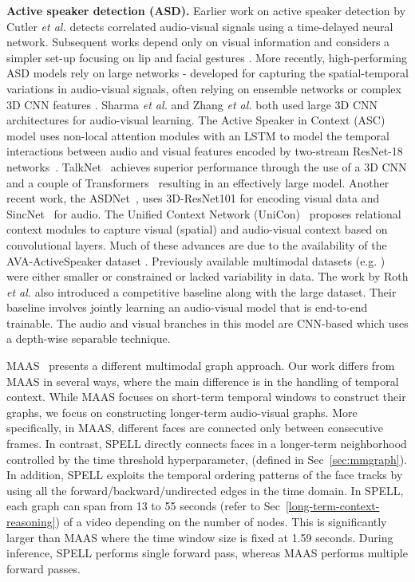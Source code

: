\documentclass[runningheads]{llncs}
\begin{document}
\textbf{Active speaker detection (ASD). } Earlier work on active speaker detection by Cutler \textit{et al.} \cite{cutler2000look} detects correlated audio-visual signals using a time-delayed neural network. Subsequent works depend only on visual information and considers a simpler set-up focusing on lip and facial gestures \cite{everingham2006hello}. More recently, high-performing ASD models rely on large networks - developed for capturing the spatial-temporal variations in audio-visual signals, often relying on ensemble networks or complex 3D CNN features \cite{alcazarActiveSpeakersContext2020,tao2021someone}. Sharma \textit{et al.} \cite{sharma2020crossmodal} and Zhang \textit{et al.} \cite{zhang2019multi} both used large 3D CNN architectures for audio-visual learning. The Active Speaker in Context (ASC) model \cite{alcazarActiveSpeakersContext2020} uses non-local attention modules with an LSTM to model the temporal interactions between audio and visual features encoded by two-stream ResNet-18 networks~\cite{he2016deep}. TalkNet~\cite{tao2021someone} achieves superior performance through the use of a 3D CNN and a couple of Transformers~\cite{vaswani2017attention} resulting in an effectively large model. Another recent work, the ASDNet~\cite{ASDNet_ICCV2021}, uses 3D-ResNet101 for encoding visual data and SincNet~\cite{ravanelli2018speaker} for audio. The Unified Context Network (UniCon)~\cite{zhang2021unicon} proposes relational context modules to capture visual (spatial) and audio-visual context based on convolutional layers.
Much of these advances are due to the availability of the AVA-ActiveSpeaker dataset \cite{roth2020ava}. Previously available multimodal datasets (e.g. \cite{chakravarty2016cross}) were either smaller or constrained or lacked variability in data.  The work by Roth \textit{et al.} \cite{roth2020ava} also introduced a competitive baseline along with the large dataset. Their baseline involves jointly learning an audio-visual model that is end-to-end trainable. The audio and visual branches in this model are CNN-based which uses a depth-wise separable technique.

MAAS~\cite{MAAS2021} presents a different multimodal graph approach. Our work differs from MAAS in several ways, where the main difference is in the handling of temporal context. While MAAS focuses on short-term temporal windows to construct their graphs, we focus on constructing longer-term audio-visual graphs. More specifically, in MAAS, different faces are connected only between consecutive frames. In contrast, SPELL directly connects faces in a longer-term neighborhood controlled by the time threshold hyperparameter,  (defined in Sec~\ref{sec:mmgraph}). In addition, SPELL exploits the temporal ordering patterns of the face tracks by using all the forward/backward/undirected edges in the time domain. 
In SPELL, each graph can span from 13 to 55 seconds (refer to Sec~\ref{long-term-context-reasoning}) of a video depending on the number of nodes. This is significantly larger than MAAS where the time window size is fixed at 1.59 seconds. During inference, SPELL performs single forward pass, whereas MAAS performs multiple forward passes.
 
\end{document}
